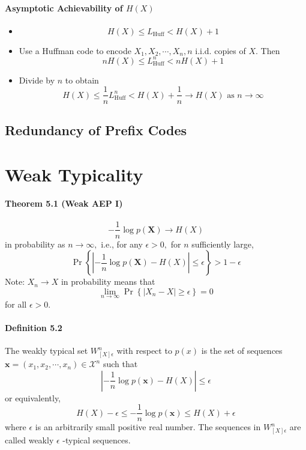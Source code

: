 \documentclass[8pt]{article}
\begin{document}
\paragraph{Asymptotic Achievability of $H(X)$}
\begin{itemize}
	\item $$
	H(X) \leq L_{\mathrm{Huff}}<H(X)+1
	$$
	\item Use a Huffman code to encode $X_{1}, X_{2}, \cdots, X_{n}, n$ i.i.d. copies of $X .$ Then
	$$
	n H(X) \leq L_{\mathrm{Huff}}^{n}<n H(X)+1
	$$
	\item Divide by $n$ to obtain
	$$
	H(X) \leq \frac{1}{n} L_{\mathrm{Huff}}^{n}<H(X)+\frac{1}{n} \rightarrow H(X) \text { as } n \rightarrow \infty
	$$

\end{itemize}

\subsection{Redundancy of Prefix Codes}

\section{Weak Typicality}
\begin{tcolorbox}
\paragraph{Theorem 5.1 (Weak AEP I)}
$$
-\frac{1}{n} \log p(\mathbf{X}) \rightarrow H(X)
$$
in probability as $n \rightarrow \infty,$ i.e., for any $\epsilon>0,$ for $n$ sufficiently large,
$$
\operatorname{Pr}\left\{\left|-\frac{1}{n} \log p(\mathbf{X})-H(X)\right| \leq \epsilon\right\}>1-\epsilon
$$
Note: $X_{n} \rightarrow X$ in probability means that
$$
\lim _{n \rightarrow \infty} \operatorname{Pr}\left\{\left|X_{n}-X\right| \geq \epsilon\right\}=0
$$
for all $\epsilon>0$.
\end{tcolorbox}

\begin{tcolorbox}
\paragraph{Definition 5.2} The weakly typical set $W_{[X] \epsilon}^{n}$ with respect to $p(x)$ is the set of sequences $\mathbf{x}=\left(x_{1}, x_{2}, \cdots, x_{n}\right) \in \mathcal{X}^{n}$ such that
$$
\left|-\frac{1}{n} \log p(\mathbf{x})-H(X)\right| \leq \epsilon
$$
or equivalently,
$$
H(X)-\epsilon \leq-\frac{1}{n} \log p(\mathbf{x}) \leq H(X)+\epsilon
$$
where $\epsilon$ is an arbitrarily small positive real number. The sequences in $W_{[X] \epsilon}^{n}$ are called weakly $\epsilon$ -typical sequences.
\end{tcolorbox}
\end{document}
